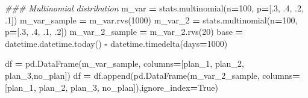 \documentclass[
]{book}
\newenvironment{Shaded}{\begin{snugshade}}{\end{snugshade}}
\newcommand{\CommentTok}[1]{\textcolor[rgb]{0.56,0.35,0.01}{\textit{#1}}}
\newcommand{\DecValTok}[1]{\textcolor[rgb]{0.00,0.00,0.81}{#1}}
\newcommand{\FloatTok}[1]{\textcolor[rgb]{0.00,0.00,0.81}{#1}}
\newcommand{\NormalTok}[1]{#1}
\newcommand{\OperatorTok}[1]{\textcolor[rgb]{0.81,0.36,0.00}{\textbf{#1}}}
\newcommand{\StringTok}[1]{\textcolor[rgb]{0.31,0.60,0.02}{#1}}
\newcommand{\VariableTok}[1]{\textcolor[rgb]{0.00,0.00,0.00}{#1}}
\theoremstyle{definition}
\theoremstyle{definition}
\theoremstyle{definition}
\theoremstyle{remark}
\begin{document}
\begin{Shaded}
\begin{Highlighting}[]

\CommentTok{\#\#\# Multinomial distribution}
\NormalTok{m\_var }\OperatorTok{=}\NormalTok{ stats.multinomial(n}\OperatorTok{=}\DecValTok{100}\NormalTok{, p}\OperatorTok{=}\NormalTok{[}\FloatTok{.3}\NormalTok{, }\FloatTok{.4}\NormalTok{, }\FloatTok{.2}\NormalTok{, }\FloatTok{.1}\NormalTok{])}
\NormalTok{m\_var\_sample }\OperatorTok{=}\NormalTok{ m\_var.rvs(}\DecValTok{1000}\NormalTok{)}
\NormalTok{m\_var\_2 }\OperatorTok{=}\NormalTok{ stats.multinomial(n}\OperatorTok{=}\DecValTok{100}\NormalTok{, p}\OperatorTok{=}\NormalTok{[}\FloatTok{.3}\NormalTok{, }\FloatTok{.4}\NormalTok{, }\FloatTok{.1}\NormalTok{, }\FloatTok{.2}\NormalTok{])}
\NormalTok{m\_var\_2\_sample }\OperatorTok{=}\NormalTok{ m\_var\_2.rvs(}\DecValTok{20}\NormalTok{)}
\NormalTok{base }\OperatorTok{=}\NormalTok{ datetime.datetime.today() }\OperatorTok{{-}}\NormalTok{ datetime.timedelta(days}\OperatorTok{=}\DecValTok{1000}\NormalTok{)}

\NormalTok{df }\OperatorTok{=}\NormalTok{ pd.DataFrame(m\_var\_sample, columns}\OperatorTok{=}\NormalTok{[}\StringTok{\textquotesingle{}plan\_1\textquotesingle{}}\NormalTok{, }\StringTok{\textquotesingle{}plan\_2\textquotesingle{}}\NormalTok{, }\StringTok{\textquotesingle{}plan\_3\textquotesingle{}}\NormalTok{,}\StringTok{\textquotesingle{}no\_plan\textquotesingle{}}\NormalTok{])}
\NormalTok{df }\OperatorTok{=}\NormalTok{ df.append(pd.DataFrame(m\_var\_2\_sample, columns}\OperatorTok{=}\NormalTok{[}\StringTok{\textquotesingle{}plan\_1\textquotesingle{}}\NormalTok{, }\StringTok{\textquotesingle{}plan\_2\textquotesingle{}}\NormalTok{, }\StringTok{\textquotesingle{}plan\_3\textquotesingle{}}\NormalTok{, }\StringTok{\textquotesingle{}no\_plan\textquotesingle{}}\NormalTok{]),ignore\_index}\OperatorTok{=}\VariableTok{True}\NormalTok{)}


\end{Highlighting}
\end{Shaded}
\end{document}
